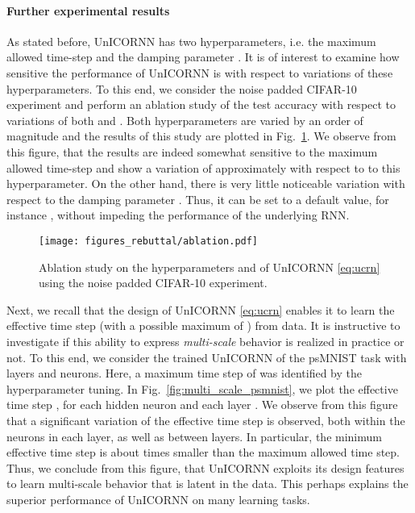 \documentclass{article}
\newcommand{\fref}[1] {Fig.~\ref{#1}}
\begin{document}
\paragraph{Further experimental results}
As stated before, UnICORNN has two hyperparameters, i.e. the maximum allowed time-step  and the damping parameter . It is of interest to examine how sensitive the performance of UnICORNN is with respect to variations of these hyperparameters. To this end, we consider the noise padded CIFAR-10 experiment and perform an ablation study of the test accuracy with respect to variations of both  and . Both hyperparameters are varied by an order of magnitude and the results of this study are plotted in \fref{fig:ablation}. We observe from this figure, that the results are indeed somewhat sensitive to the maximum allowed time-step  and show a variation of approximately  with respect to to this hyperparameter. On the other hand, there is very little noticeable variation with respect to the damping parameter . Thus, it can be set to a default value, for instance , without impeding the performance of the underlying RNN.  

\begin{figure}[ht]
\vskip 0.2in
\begin{center}
\centerline{\texttt{[image: figures\_rebuttal/ablation.pdf]}}
\caption{Ablation study on the hyperparameters  and  of UnICORNN \eqref{eq:ucrn} using the noise padded CIFAR-10 experiment.}
\label{fig:ablation}
\end{center}
\vskip -0.2in
\end{figure}
Next, we recall that the design of UnICORNN \eqref{eq:ucrn} enables it to learn the effective time step (with a possible maximum of ) from data. It is instructive to investigate if this ability to express \emph{multi-scale} behavior is realized in practice or not. To this end, we consider the trained UnICORNN of the psMNIST task with  layers and  neurons. Here, a maximum time step of  was identified by the hyperparameter tuning. In \fref{fig:multi_scale_psmnist}, we plot the effective time step  , for each hidden neuron  and each layer . We observe from this figure that a significant variation of the effective time step is observed, both within the neurons in each layer, as well as between layers. In particular, the minimum effective time step is about  times smaller than the maximum allowed time step. Thus, we conclude from this figure, that UnICORNN exploits its design features to learn multi-scale behavior that is latent in the data. This perhaps explains the superior performance of UnICORNN on many learning tasks. 
\end{document}
